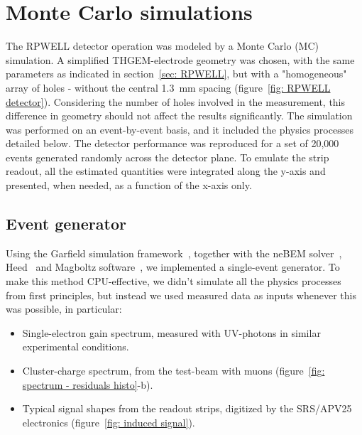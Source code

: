 \section{Monte Carlo simulations}
\label{sec: Simulation}

The RPWELL detector operation was modeled by a Monte Carlo (MC) simulation. A simplified THGEM-electrode geometry was chosen, with the same parameters as indicated in section~\ref{sec: RPWELL}, but with a "homogeneous" array of holes - without the central 1.3~mm spacing (figure~\ref{fig: RPWELL detector}). Considering the number of holes involved in the measurement, this difference in geometry should not affect the results significantly. The simulation was performed on an event-by-event basis, and it included the physics processes detailed below. The detector performance was reproduced for a set of 20,000 events generated randomly across the detector plane. To emulate the strip readout, all the estimated quantities were integrated along the y-axis and presented, when needed, as a function of the x-axis only.

\subsection{Event generator}
Using the Garfield simulation framework~\cite{veenhof2015garfield}, together with the neBEM solver~\cite{muhkopadhyay2006computation}, Heed~\cite{smirnov2005modeling} and Magboltz software~\cite{biagi2016magboltz}, we implemented a single-event generator. To make this method CPU-effective, we didn't simulate all the physics processes from first principles, but instead we used measured data as inputs whenever this was possible, in particular:
\begin{itemize}
\item Single-electron gain spectrum, measured with UV-photons in similar experimental conditions.
\item Cluster-charge spectrum, from the test-beam with muons (figure~\ref{fig: spectrum - residuals histo}-b).
\item Typical signal shapes from the readout strips, digitized by the SRS/APV25 electronics (figure~\ref{fig: induced signal}).
\end{itemize}

